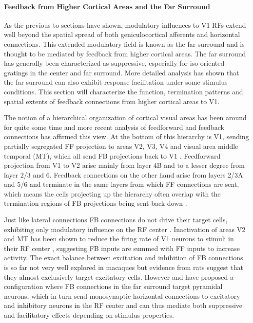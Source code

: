 \paragraph{Feedback from Higher Cortical Areas and the Far Surround}

As the previous to sections have shown, modulatory influences to V1
RFs extend well beyond the spatial spread of both geniculocortical
afferents and horizontal connections. This extended modulatory field
is known as the far surround and is thought to be mediated by feedback
from higher cortical areas. The far surround has generally been
characterized as suppressive, especially for iso-oriented gratings in
the center and far surround. More detailed analysis has shown that the
far surround can also exhibit response facilitation under some
stimulus conditions. This section will characterize the function,
termination patterns and spatial extents of feedback connections from
higher cortical areas to V1.

The notion of a hierarchical organization of cortical visual areas has
been around for quite some time and more recent analysis of
feedforward and feedback connections has affirmed this view. At the
bottom of this hierarchy is V1, sending partially segregated FF
projection to areas V2, V3, V4 and visual area middle temporal (MT),
which all send FB projections back to V1
\citep{Felleman1991}. Feedforward projection from V1 to V2 arise
mainly from layer 4B and to a lesser degree from layer 2/3 and
6. Feedback connections on the other hand arise from layers 2/3A and
5/6 and terminate in the same layers from which FF connections are
sent, which means the cells projecting up the hierarchy often overlap
with the termination regions of FB projections being sent back down
\citep{Angelucci2002}.

Just like lateral connections FB connections do not drive their target
cells, exhibiting only modulatory influence on the RF center
\citep{Bullier2001a}. Inactivation of areas V2 and MT has been shown
to reduce the firing rate of V1 neurons to stimuli in their RF center
\citep{Hupe1998}, suggesting FB inputs are summed with FF inputs to
increase activity. The exact balance between excitation and inhibition
of FB connections is so far not very well explored in macaques but
evidence from rats suggest that they almost exclusively target
excitatory cells. However \cite{Angelucci2006} and \cite{Schwabe2006}
have proposed a configuration where FB connections in the far surround
target pyramidal neurons, which in turn send monosynaptic horizontal
connections to excitatory and inhibitory neurons in the RF center and
can thus mediate both suppressive and facilitatory effects depending
on stimulus properties.

